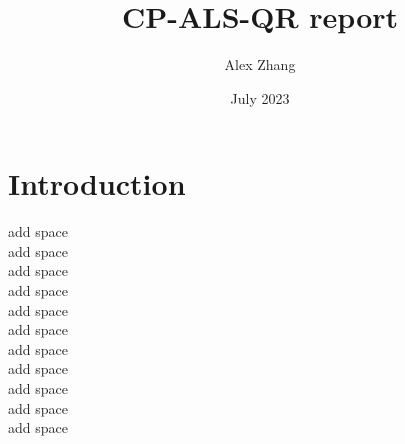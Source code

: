 \documentclass{article}
\title{CP-ALS-QR report}
\author{Alex Zhang}
\date{July 2023}
\begin{document}
\maketitle
\section{Introduction}


add space\\
add space\\
add space\\
add space\\
add space\\
add space\\
add space\\
add space\\
add space\\
add space\\
add space\\
\end{document}
